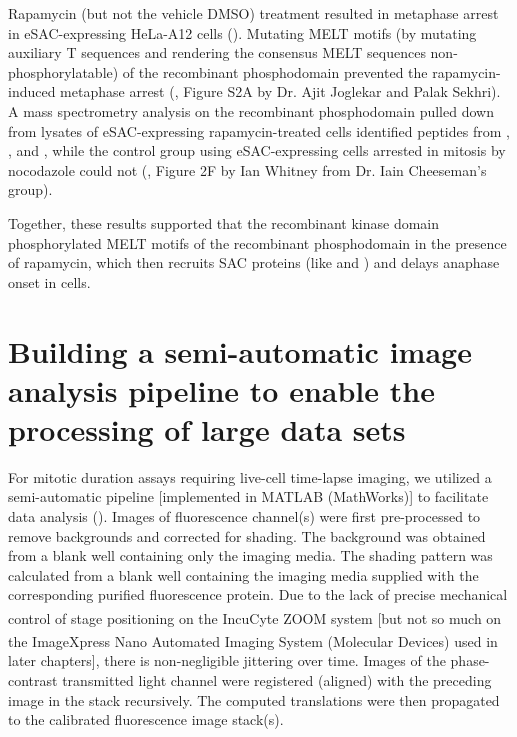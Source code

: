 Rapamycin (but not the vehicle DMSO) treatment resulted in metaphase arrest in eSAC-expressing HeLa-A12 cells (). Mutating MELT motifs (by mutating auxiliary T\textOmega{} sequences \cite{RecombinantKNL1, MELTActivity} and rendering the consensus MELT sequences non-phosphorylatable) of the recombinant phosphodomain prevented the rapamycin-induced metaphase arrest (\cite{eSAC}, Figure S2A by Dr. Ajit Joglekar and Palak Sekhri). A mass spectrometry analysis on the recombinant phosphodomain pulled down from lysates of eSAC-expressing rapamycin-treated cells identified peptides from , , and , while the control group using eSAC-expressing cells arrested in mitosis by nocodazole could not (\cite{eSAC}, Figure 2F by Ian Whitney from Dr. Iain Cheeseman's group).

Together, these results supported that the recombinant  kinase domain phosphorylated MELT motifs of the recombinant  phosphodomain in the presence of rapamycin, which then recruits SAC proteins (like  and ) and delays anaphase onset in cells.

\section{Building a semi-automatic image analysis pipeline to enable the processing of large data sets}
\label{IncuCyteAnalysis}
For mitotic duration assays requiring live-cell time-lapse imaging, we utilized a semi-automatic pipeline [implemented in MATLAB (MathWorks)] to facilitate data analysis (). Images of fluorescence channel(s) were first pre-processed to remove backgrounds and corrected for shading. The background was obtained from a blank well containing only the imaging media. The shading pattern was calculated from a blank well containing the imaging media supplied with the corresponding purified fluorescence protein. Due to the lack of precise mechanical control of stage positioning on the IncuCyte\textsuperscript{\textregistered} ZOOM system [but not so much on the ImageXpress\textsuperscript{\textregistered} Nano Automated Imaging System (Molecular Devices) used in later chapters], there is non-negligible jittering over time. Images of the phase-contrast transmitted light channel were registered (aligned) with the preceding image in the stack recursively. The computed translations were then propagated to the calibrated fluorescence image stack(s).

